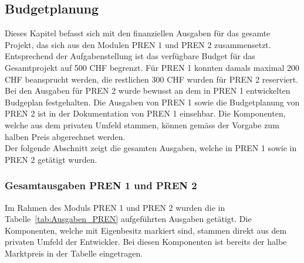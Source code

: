 \documentclass[main.tex]{subfiles} %
\begin{document}

\subsection{Budgetplanung}

Dieses Kapitel befasst sich mit den finanziellen Ausgaben für das gesamte Projekt, das sich aus den Modulen PREN 1 und PREN 2 zusammensetzt.
Entsprechend der Aufgabenstellung ist das verfügbare Budget 
für das Gesamtprojekt auf 500 CHF begrenzt. Für PREN 1 konnten damals maximal 200 CHF
beansprucht werden, die restlichen 300 CHF wurden für PREN 2 reserviert. Bei den Ausgaben für PREN 2 wurde bewusst an dem in PREN 1 entwickelten Budgeplan festgehalten.
Die Ausgaben von PREN 1 sowie die Budgetplanung von PREN 2 ist in der Dokumentation von PREN 1 einsehbar.
Die Komponenten, welche aus dem privaten Umfeld stammen, 
können gemäss der Vorgabe zum halben Preis abgerechnet werden.\\
Der folgende Abschnitt zeigt die gesamten Ausgaben, welche in PREN 1 sowie in PREN 2 getätigt wurden.

\subsubsection{Gesamtausgaben PREN 1 und PREN 2}
Im Rahmen des Moduls PREN 1 und PREN 2 wurden die in
Tabelle~\ref{tab:Ausgaben_PREN} aufgeführten Ausgaben getätigt. Die Komponenten, welche mit 
Eigenbesitz markiert sind, stammen direkt aus dem privaten Umfeld der Entwickler.
Bei diesen Komponenten ist bereits der halbe Marktpreis in der Tabelle eingetragen.
\end{document}
